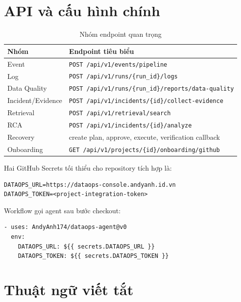 \documentclass[12pt,a4paper,oneside]{report}
\newcommand{\code}[1]{\texttt{#1}}
\begin{document}
\chapter{API và cấu hình chính}

\begin{table}[H]
\centering
\caption{Nhóm endpoint quan trọng}
\begin{tabularx}{\textwidth}{L{5.8cm} Y}
\toprule
\textbf{Nhóm} & \textbf{Endpoint tiêu biểu} \\
\midrule
Event & \code{POST /api/v1/events/pipeline} \\
Log & \code{POST /api/v1/runs/\{run\_id\}/logs} \\
Data Quality & \code{POST /api/v1/runs/\{run\_id\}/reports/data-quality} \\
Incident/Evidence & \code{POST /api/v1/incidents/\{id\}/collect-evidence} \\
Retrieval & \code{POST /api/v1/retrieval/search} \\
RCA & \code{POST /api/v1/incidents/\{id\}/analyze} \\
Recovery & create plan, approve, execute, verification callback \\
Onboarding & \code{GET /api/v1/projects/\{id\}/onboarding/github} \\
\bottomrule
\end{tabularx}
\end{table}

Hai GitHub Secrets tối thiểu cho repository tích hợp là:

\begin{verbatim}
DATAOPS_URL=https://dataops-console.andyanh.id.vn
DATAOPS_TOKEN=<project-integration-token>
\end{verbatim}

Workflow gọi agent sau bước checkout:

\begin{verbatim}
- uses: AndyAnh174/dataops-agent@v0
  env:
    DATAOPS_URL: ${{ secrets.DATAOPS_URL }}
    DATAOPS_TOKEN: ${{ secrets.DATAOPS_TOKEN }}
\end{verbatim}

\chapter{Thuật ngữ viết tắt}
\end{document}
